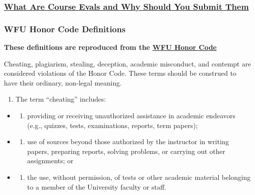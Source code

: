 \hypertarget{what-are-course-evals-and-why-should-you-submit-them}{%
\subsubsection{\texorpdfstring{\href{https://www.youtube.com/watch?v=5zkAOpx8Qk8}{What Are Course Evals and Why Should You Submit Them}}{What Are Course Evals and Why Should You Submit Them}}\label{what-are-course-evals-and-why-should-you-submit-them}}

\hypertarget{wfu-honor-code-definitions}{%
\subsubsection{WFU Honor Code Definitions}\label{wfu-honor-code-definitions}}

\textbf{These definitions are reproduced from the \href{https://studentconduct.wfu.edu/procedures-of-the-honor-and-ethics-council/}{WFU Honor Code}}

Cheating, plagiarism, stealing, deception, academic misconduct, and contempt are considered violations of the Honor Code. These terms should be construed to have their ordinary, non-legal meaning.

\begin{enumerate}
\def\labelenumi{\arabic{enumi}.}
\tightlist
\item
  The term ``cheating'' includes:
\end{enumerate}

\begin{itemize}
\item
  \begin{enumerate}
  \def\labelenumi{(\alph{enumi})}
  \tightlist
  \item
    providing or receiving unauthorized assistance in academic endeavors (e.g., quizzes, tests, examinations, reports, term papers);
  \end{enumerate}
\item
  \begin{enumerate}
  \def\labelenumi{(\alph{enumi})}
  \setcounter{enumi}{1}
  \tightlist
  \item
    use of sources beyond those authorized by the instructor in writing papers, preparing reports, solving problems, or carrying out other assignments; or
  \end{enumerate}
\item
  \begin{enumerate}
  \def\labelenumi{(\alph{enumi})}
  \setcounter{enumi}{2}
  \tightlist
  \item
    the use, without permission, of tests or other academic material belonging to a member of the University faculty or staff.
  \end{enumerate}
\end{itemize}

